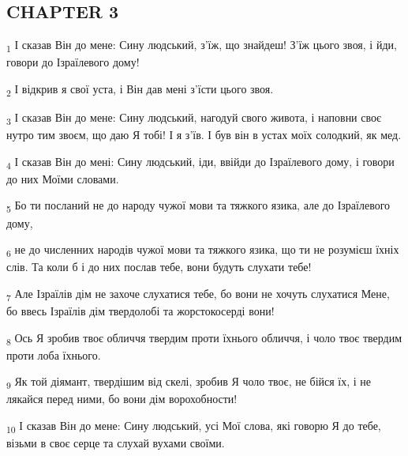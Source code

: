 \subsection{CHAPTER 3}
\begin{tcolorbox}
\textsubscript{1} І сказав Він до мене: Сину людський, з'їж, що знайдеш! З'їж цього звоя, і йди, говори до Ізраїлевого дому!
\end{tcolorbox}
\begin{tcolorbox}
\textsubscript{2} І відкрив я свої уста, і Він дав мені з'їсти цього звоя.
\end{tcolorbox}
\begin{tcolorbox}
\textsubscript{3} І сказав Він до мене: Сину людський, нагодуй свого живота, і наповни своє нутро тим звоєм, що даю Я тобі! І я з'їв. І був він в устах моїх солодкий, як мед.
\end{tcolorbox}
\begin{tcolorbox}
\textsubscript{4} І сказав Він до мені: Сину людський, іди, ввійди до Ізраїлевого дому, і говори до них Моїми словами.
\end{tcolorbox}
\begin{tcolorbox}
\textsubscript{5} Бо ти посланий не до народу чужої мови та тяжкого язика, але до Ізраїлевого дому,
\end{tcolorbox}
\begin{tcolorbox}
\textsubscript{6} не до численних народів чужої мови та тяжкого язика, що ти не розумієш їхніх слів. Та коли б і до них послав тебе, вони будуть слухати тебе!
\end{tcolorbox}
\begin{tcolorbox}
\textsubscript{7} Але Ізраїлів дім не захоче слухатися тебе, бо вони не хочуть слухатися Мене, бо ввесь Ізраїлів дім твердолобі та жорстокосерді вони!
\end{tcolorbox}
\begin{tcolorbox}
\textsubscript{8} Ось Я зробив твоє обличчя твердим проти їхнього обличчя, і чоло твоє твердим проти лоба їхнього.
\end{tcolorbox}
\begin{tcolorbox}
\textsubscript{9} Як той діямант, твердішим від скелі, зробив Я чоло твоє, не бійся їх, і не лякайся перед ними, бо вони дім ворохобности!
\end{tcolorbox}
\begin{tcolorbox}
\textsubscript{10} І сказав Він до мене: Сину людський, усі Мої слова, які говорю Я до тебе, візьми в своє серце та слухай вухами своїми.
\end{tcolorbox}
